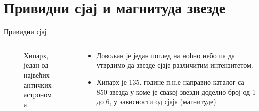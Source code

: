 \documentclass[aspectratio=169, xcolor=table, 10pt]{beamer}
\theoremstyle{definition}
\begin{document}
\section{Привидни сјај и магнитуда звезде }

\begin{frame}{Привидни сјај}
  \begin{columns}[T]
    \begin{column}{0.35\textwidth}
      \begin{figure}
        \centering
        \captionsetup{width=\wd0}
        \caption{Хипарх, један од највећих античких астронома}
      \end{figure}
    \end{column}
    \begin{column}{0.65\textwidth}
      \begin{itemize}
        \item Довољан је један поглед на ноћно небо па да утврдимо да звезде сјаје различитим интензитетом.
        \item Хипарх је 135. године п.н.е направио каталог са 850 звезда у коме је свакој звезди доделио број од 1 до 6, у зависности од сјаја (магнитуде).

\end{itemize}
\end{column}
\end{columns}
\end{frame}
\end{document}

